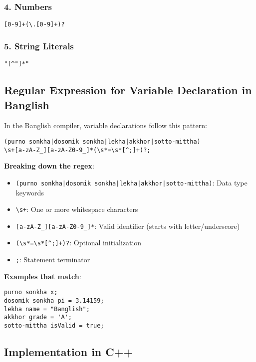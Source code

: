 \documentclass[12pt,a4paper]{article}
\begin{document}
\subsubsection{4. Numbers}
\begin{lstlisting}
[0-9]+(\.[0-9]+)?
\end{lstlisting}

\subsubsection{5. String Literals}
\begin{lstlisting}
"[^"]*"
\end{lstlisting}

\subsection{Regular Expression for Variable Declaration in Banglish}

In the Banglish compiler, variable declarations follow this pattern:

\begin{lstlisting}[caption=Variable Declaration Pattern]
(purno sonkha|dosomik sonkha|lekha|akkhor|sotto-mittha)
\s+[a-zA-Z_][a-zA-Z0-9_]*(\s*=\s*[^;]+)?;
\end{lstlisting}

\textbf{Breaking down the regex}:
\begin{itemize}
    \item \texttt{(purno sonkha|dosomik sonkha|lekha|akkhor|sotto-mittha)}: Data type keywords
    \item \texttt{\textbackslash s+}: One or more whitespace characters
    \item \texttt{[a-zA-Z\_][a-zA-Z0-9\_]*}: Valid identifier (starts with letter/underscore)
    \item \texttt{(\textbackslash s*=\textbackslash s*[\textasciicircum;]+)?}: Optional initialization
    \item \texttt{;}: Statement terminator
\end{itemize}

\textbf{Examples that match}:
\begin{lstlisting}
purno sonkha x;
dosomik sonkha pi = 3.14159;
lekha name = "Banglish";
akkhor grade = 'A';
sotto-mittha isValid = true;
\end{lstlisting}

\subsection{Implementation in C++}
\end{document}
